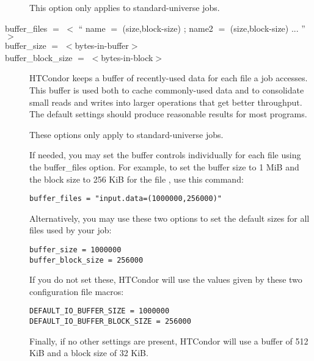 \begin{description}
This option only applies to standard-universe jobs.


\label{condor-submit-buffer-files}
\label{condor-submit-buffer-size}
\label{condor-submit-buffer-block-size}
\item[buffer\_files $=$ $<$ `` name $=$ (size,block-size) ; name2 $=$ (size,block-size) ... '' $>$ ]
\item[buffer\_size $=$ $<$bytes-in-buffer$>$]
\item[buffer\_block\_size $=$ $<$bytes-in-block$>$]
HTCondor keeps a buffer of recently-used data for each file a job accesses.
This buffer is used both to cache commonly-used data and to consolidate small
reads and writes into larger operations that get better throughput.
The default settings should produce reasonable results for most programs.

These options only apply to standard-universe jobs.

If needed, you may set the buffer controls individually for each file using
the buffer\_files option. For example, to set the buffer size to 1 MiB and
the block size to 256 KiB for the file , use this command:

\begin{verbatim}
buffer_files = "input.data=(1000000,256000)"
\end{verbatim}

Alternatively, you may use these two options to set
the default sizes for all files used by your job:

\begin{verbatim}
buffer_size = 1000000
buffer_block_size = 256000
\end{verbatim}

If you do not set these, HTCondor will use the values given by these
two configuration file macros:

\begin{verbatim}
DEFAULT_IO_BUFFER_SIZE = 1000000
DEFAULT_IO_BUFFER_BLOCK_SIZE = 256000
\end{verbatim}

Finally, if no other settings are present, HTCondor will use
a buffer of 512 KiB
and a block size of 32 KiB.



\end{description}
